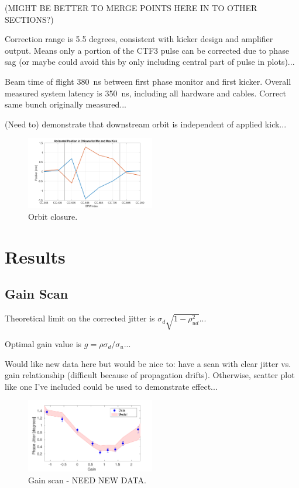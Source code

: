 \documentclass[%
 reprint,
 amsmath,amssymb,
 aps,
]{revtex4-1}
\begin{document}
(MIGHT BE BETTER TO MERGE POINTS HERE IN TO OTHER SECTIONS?)

Correction range is 5.5 degrees, consistent with kicker design and amplifier output. Means only a portion of the CTF3 pulse can be corrected due to phase sag (or maybe could avoid this by only including central part of pulse in plots)...

Beam time of flight 380~ns between first phase monitor and first kicker. Overall measured system latency is 350~ns, including all hardware and cables. Correct same bunch originally measured...

(Need to) demonstrate that downstream orbit is independent of applied kick...

\begin{figure}
\includegraphics[width=0.5\textwidth]{figs/orbClos}%
\caption{\label{fig:orbClos}Orbit closure.}
\end{figure}


\section{\label{s:results}Results}

\subsection{\label{ss:gScan}Gain Scan}

Theoretical limit on the corrected jitter is \(\sigma_d \sqrt{1-\rho_{ud}^2}\)...

Optimal gain value is \(g = \rho \sigma_d/\sigma_u\)...

Would like new data here but would be nice to: have a scan with clear jitter vs. gain relationship (difficult because of propagation drifts). Otherwise, scatter plot like one I've included could be used to demonstrate effect...

\begin{figure}
\includegraphics[width=0.5\textwidth]{figs/gScan}%
\caption{\label{fig:gScan}Gain scan - NEED NEW DATA.}
\end{figure}
\end{document}
